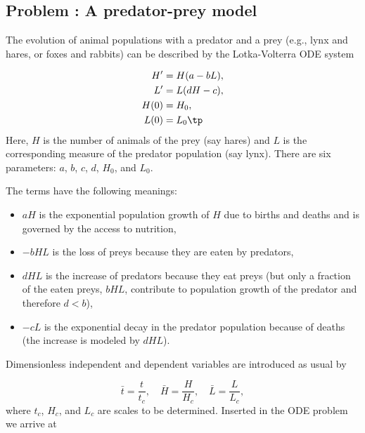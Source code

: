 \documentclass[graybox,envcountchap,sectrefs,final]{svmonodo}
\newcounter{doconce:movie:counter}
\newenvironment{doconceexercise}{}{}
\newcounter{doconceexercisecounter}
\begin{document}
\begin{doconceexercise}

\subsection*{Problem \thedoconceexercisecounter: A predator-prey model}

\label{scale:decay:exer:predprey}


The evolution of animal populations with a predator and a prey (e.g.,
lynx and hares, or foxes and rabbits) can be described by the
Lotka-Volterra ODE system

\begin{align}
H^{\prime} &= H(a - bL),
\label{scale:decay:exer:predprey:eqH}\\ 
L^{\prime} &= L(dH - c),
\label{scale:decay:exer:predprey:eqL}\\ 
H(0)&=H_0,\\ 
L(0)&=L_0\tp
\end{align}
Here, $H$ is the number of animals of the prey (say hares)
and $L$ is the corresponding measure of the predator population (say lynx).
There are six parameters: $a$, $b$, $c$, $d$, $H_0$, and $L_0$.

The terms have the following meanings:

\begin{itemize}
 \item $aH$ is the exponential
   population growth of $H$ due to births and deaths and is governed by
   the access to nutrition,

 \item $-bHL$ is the loss of preys because they are eaten by predators,

 \item $dHL$ is the increase of predators because they eat preys (but only
   a fraction of the eaten preys, $bHL$, contribute to population growth
   of the predator and therefore $d < b$),

 \item $-cL$ is the exponential decay in the predator population because of
   deaths (the increase is modeled by $dHL$).
\end{itemize}

\noindent
Dimensionless independent and dependent variables are introduced as usual
by

\[ \bar t = \frac{t}{t_c},\quad
\bar H = \frac{H}{H_c},\quad \bar L = \frac{L}{L_c},
\]
where $t_c$, $H_c$, and $L_c$ are scales to be determined. Inserted
in the ODE problem we arrive at


\end{doconceexercise}
\end{document}
